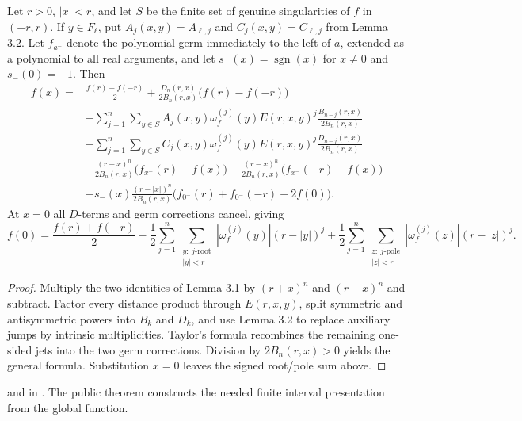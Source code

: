 \begin{theorem}
\leanok
{}
Let $r>0$, $|x|<r$, and let $S$ be the finite set of genuine singularities of
$f$ in $(-r,r)$.  If $y\in F_\ell$, put
$A_j(x,y)=A_{\ell,j}$ and $C_j(x,y)=C_{\ell,j}$ from Lemma 3.2.  Let
$f_{a^-}$ denote the polynomial germ immediately to the left of $a$, extended
as a polynomial to all real arguments, and let
$s_-(x)=\operatorname{sgn}(x)$ for $x\neq0$ and $s_-(0)=-1$.  Then
\begin{align*}
f(x)={}&\frac{f(r)+f(-r)}2
+\frac{D_n(r,x)}{2B_n(r,x)}\bigl(f(r)-f(-r)\bigr)\\
&-\sum_{j=1}^n\sum_{y\in S}
A_j(x,y)\omega_f^{(j)}(y)E(r,x,y)^j
\frac{B_{n-j}(r,x)}{2B_n(r,x)}\\
&-\sum_{j=1}^n\sum_{y\in S}
C_j(x,y)\omega_f^{(j)}(y)E(r,x,y)^j
\frac{D_{n-j}(r,x)}{2B_n(r,x)}\\
&-\frac{(r+x)^n}{2B_n(r,x)}\bigl(f_{x^-}(r)-f(x)\bigr)
-\frac{(r-x)^n}{2B_n(r,x)}\bigl(f_{x^-}(-r)-f(x)\bigr)\\
&-s_-(x)\frac{(r-|x|)^n}{2B_n(r,x)}
 \bigl(f_{0^-}(r)+f_{0^-}(-r)-2f(0)\bigr).
\end{align*}
At $x=0$ all $D$-terms and germ corrections cancel, giving
\[
 f(0)=\frac{f(r)+f(-r)}2
 -\frac12\sum_{j=1}^n\sum_{\substack{y:\ j\text{-root}\\|y|<r}}
    |\omega_f^{(j)}(y)|(r-|y|)^j
 +\frac12\sum_{j=1}^n\sum_{\substack{z:\ j\text{-pole}\\|z|<r}}
    |\omega_f^{(j)}(z)|(r-|z|)^j.
\]
\end{theorem}

\begin{proof}
\leanok
Multiply the two identities of Lemma 3.1 by $(r+x)^n$ and $(r-x)^n$ and
subtract.  Factor every distance product through $E(r,x,y)$, split symmetric
and antisymmetric powers into $B_k$ and $D_k$, and use Lemma 3.2 to replace
auxiliary jumps by intrinsic multiplicities.  Taylor's formula recombines the
remaining one-sided jets into the two germ corrections.  Division by
$2B_n(r,x)>0$ yields the general formula.  Substitution $x=0$ leaves the
signed root/pole sum above.
\end{proof}

\begin{leanproof}
 and  in
.  The public theorem constructs the needed
finite interval presentation from the global function.
\end{leanproof}

